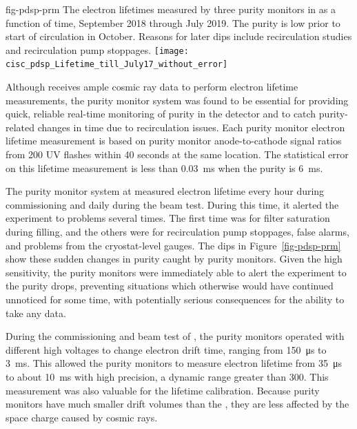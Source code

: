\begin{dunefigure}{fig-pdsp-prm}
  {The electron lifetimes measured by three purity monitors in  as a function of time, September 2018 through July 2019. The purity is low prior to start of circulation in October. Reasons for later dips include recirculation studies and recirculation pump stoppages.}
  \texttt{[image: cisc\_pdsp\_Lifetime\_till\_July17\_without\_error]}
\end{dunefigure}

Although  receives ample cosmic ray data to perform electron lifetime measurements, the purity monitor system was found to be essential for providing quick, reliable real-time monitoring of purity in the detector and to catch purity-related changes in time due to  recirculation issues. 
Each purity monitor electron lifetime measurement is based on purity monitor anode-to-cathode signal ratios from 200 UV flashes within 40 seconds at the same location. The statistical error on this lifetime measurement is less than \SI{0.03}{ms} when the purity is \SI{6}{ms}. 

The purity monitor system at  measured electron lifetime every hour during commissioning and daily during the beam test. During 
this time, it alerted the experiment to problems several times. 
The first time was for filter saturation during  filling, and the others were for recirculation pump stoppages, false alarms, and problems from the cryostat-level gauges.  The dips in Figure~\ref{fig-pdsp-prm} show these sudden changes in purity caught by purity monitors. 
Given the high sensitivity, the  purity monitors  were immediately able to alert the experiment to the purity drops, 
preventing situations which otherwise would have continued unnoticed for some time, with potentially serious consequences for the ability to take any data. 

During the commissioning and beam test of , the purity monitors operated with different high voltages to change electron drift time, ranging from \SI{150}{\micro\second} to \SI{3}{\milli\second}. This allowed the  purity monitors to measure electron lifetime from \SI{35}{\micro\second} to about \SI{10}{\milli\second} with high precision, a dynamic range greater than \num{300}. 
This measurement was also valuable for the  lifetime calibration. Because purity monitors have much smaller drift volumes than the , they are less affected by the space charge caused by cosmic rays. 

